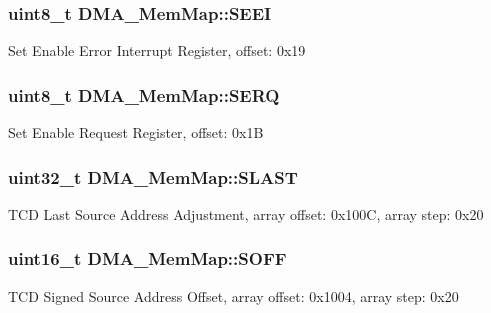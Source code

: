 \subsubsection[{S\+E\+E\+I}]{\setlength{\rightskip}{0pt plus 5cm}uint8\+\_\+t D\+M\+A\+\_\+\+Mem\+Map\+::\+S\+E\+E\+I}\label{struct_d_m_a___mem_map_a576075e4d10859c84e48e7abc1e030aa}
Set Enable Error Interrupt Register, offset\+: 0x19 \hypertarget{struct_d_m_a___mem_map_ac6934aad6952b966b2d0bed0e5d4d58c}{}
\subsubsection[{S\+E\+R\+Q}]{\setlength{\rightskip}{0pt plus 5cm}uint8\+\_\+t D\+M\+A\+\_\+\+Mem\+Map\+::\+S\+E\+R\+Q}\label{struct_d_m_a___mem_map_ac6934aad6952b966b2d0bed0e5d4d58c}
Set Enable Request Register, offset\+: 0x1\+B \hypertarget{struct_d_m_a___mem_map_a2642aa56631c9a8c9b83ca244f8ce0dd}{}
\subsubsection[{S\+L\+A\+S\+T}]{\setlength{\rightskip}{0pt plus 5cm}uint32\+\_\+t D\+M\+A\+\_\+\+Mem\+Map\+::\+S\+L\+A\+S\+T}\label{struct_d_m_a___mem_map_a2642aa56631c9a8c9b83ca244f8ce0dd}
T\+C\+D Last Source Address Adjustment, array offset\+: 0x100\+C, array step\+: 0x20 \hypertarget{struct_d_m_a___mem_map_abbbb3ec6364c286b7db38b8eefb64250}{}
\subsubsection[{S\+O\+F\+F}]{\setlength{\rightskip}{0pt plus 5cm}uint16\+\_\+t D\+M\+A\+\_\+\+Mem\+Map\+::\+S\+O\+F\+F}\label{struct_d_m_a___mem_map_abbbb3ec6364c286b7db38b8eefb64250}
T\+C\+D Signed Source Address Offset, array offset\+: 0x1004, array step\+: 0x20 \hypertarget{struct_d_m_a___mem_map_a39ea12b8e20431f54f8c6ba9f08bfc1b}{}
